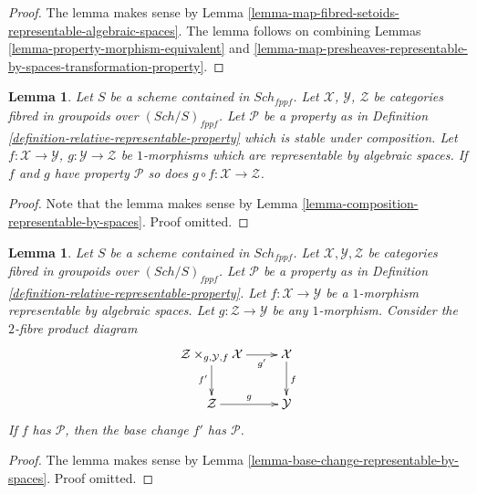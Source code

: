 \documentclass{stacks-project}
\theoremstyle{plain}
\newtheorem{lemma}[subsection]{Lemma}
\theoremstyle{definition}
\theoremstyle{remark}
\numberwithin{equation}{subsection}
\def\Sch{\mathit{Sch}}
\begin{document}
\begin{proof}
The lemma makes sense by
Lemma \ref{lemma-map-fibred-setoids-representable-algebraic-spaces}.
The lemma follows on combining
Lemmas \ref{lemma-property-morphism-equivalent}
and \ref{lemma-map-presheaves-representable-by-spaces-transformation-property}.
\end{proof}

\begin{lemma}
\label{lemma-composition-representable-transformations-property}
Let $S$ be a scheme contained in $\Sch_{fppf}$.
Let $\mathcal{X}$, $\mathcal{Y}$, $\mathcal{Z}$ be categories fibred
in groupoids over $(\Sch/S)_{fppf}$.
Let $\mathcal{P}$ be a property as in
Definition \ref{definition-relative-representable-property}
which is stable under composition.
Let $f : \mathcal{X} \to \mathcal{Y}$,
$g : \mathcal{Y} \to \mathcal{Z}$ be $1$-morphisms which
are representable by algebraic spaces.
If $f$ and $g$ have property $\mathcal{P}$ so does
$g \circ f : \mathcal{X} \to \mathcal{Z}$.
\end{lemma}

\begin{proof}
Note that the lemma makes sense by
Lemma \ref{lemma-composition-representable-by-spaces}.
Proof omitted.
\end{proof}

\begin{lemma}
\label{lemma-base-change-representable-transformations-property}
Let $S$ be a scheme contained in $\Sch_{fppf}$.
Let $\mathcal{X}, \mathcal{Y}, \mathcal{Z}$
be categories fibred in groupoids over $(\Sch/S)_{fppf}$.
Let $\mathcal{P}$ be a property as in
Definition \ref{definition-relative-representable-property}.
Let $f : \mathcal{X} \to \mathcal{Y}$ be a $1$-morphism
representable by algebraic spaces.
Let $g : \mathcal{Z} \to \mathcal{Y}$ be any $1$-morphism.
Consider the $2$-fibre product diagram
$$
\xymatrix{
\mathcal{Z} \times_{g, \mathcal{Y}, f} \mathcal{X} \ar[r]_-{g'} \ar[d]_{f'} &
\mathcal{X} \ar[d]^f \\
\mathcal{Z} \ar[r]^g & \mathcal{Y}
}
$$
If $f$ has $\mathcal{P}$, then the base change $f'$
has $\mathcal{P}$.
\end{lemma}

\begin{proof}
The lemma makes sense by
Lemma \ref{lemma-base-change-representable-by-spaces}.
Proof omitted.
\end{proof}
\end{document}
